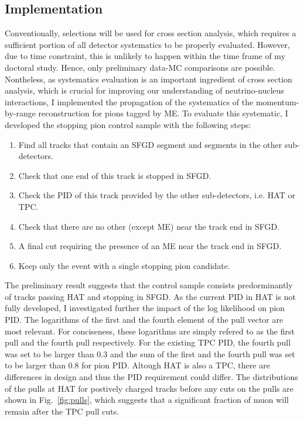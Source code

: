           \subsection{Implementation}
          \label{sec:sppi-imp}
          Conventionally, selections will be used for cross section analysis, which requires a sufficient portion of all detector systematics to be properly evaluated.
          However, due to time constraint, this is unlikely to happen within the time frame of my doctoral study. 
          Hence, only preliminary data-MC comparisons are possible.
          Nontheless, as systematics evaluation is an important ingredient of cross section analysis, which is crucial for improving our understanding of neutrino-nucleus interactions, I implemented the propagation of the systematics of the momentum-by-range reconstruction for pions tagged by ME.
          To evaluate this systematic, I developed the stopping pion control sample with the following steps:
          \begin{enumerate}
          \item Find all tracks that contain an SFGD segment and segments in the other sub-detectors.
          \item Check that one end of this track is stopped in SFGD.
          \item Check the PID of this track provided by the other sub-detectors, i.e. HAT or TPC.
          \item Check that there are no other (except ME) near the track end in SFGD.
          \item A final cut requiring the presence of an ME near the track end in SFGD.
          \item Keep only the event with a single stopping pion candidate.
          \end{enumerate}
          The preliminary result suggests that the control sample consists predorminantly of tracks passing HAT and stopping in SFGD.
          As the current PID in HAT is not fully developed, I investigated further the impact of the log likelihood on pion PID.
          The logarithms of the first and the fourth element of the pull vector are most relevant.
          For conciseness, these logarithms are simply refered to as the first pull and the fourth pull respectively. 
          For the existing TPC PID, the fourth pull was set to be larger than $0.3$ and the sum of the first and the fourth pull was set to be larger than $0.8$ for pion PID. 
          Altough HAT is also a TPC, there are differences in design and thus the PID requirement could differ.
          The distributions of the pulls at HAT for postively charged tracks before any cuts on the pulls are shown in Fig.~\ref{fig:pulls}, which suggests that a significant fraction of muon will remain after the TPC pull cuts.

